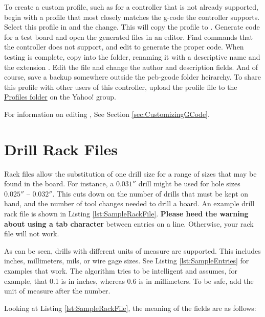 \documentclass[11pt]{book}
\begin{document}
To create a custom profile, such as for a controller that is not already supported, begin with a profile that most closely matches the g-code the controller supports. Select this profile in  and  the change. This will copy the profile to . Generate code for a test board and open the generated files in an editor. Find commands that the controller does not support, and edit  to generate the proper code. When testing is complete, copy  into the  folder, renaming it with a descriptive name and the extension . Edit the file and change the author and description fields. And of course, save a backup somewhere outside the pcb-gcode folder heirarchy. To share this profile with other users of this controller, upload the profile file to the \href{http://groups.yahoo.com/group/pcb-gcode/files/%21%20Software/Profiles/}{Profiles folder} on the Yahoo! group.

For information on editing , See Section \vref{sec:CustomizingGCode}.


%
%
\section{Drill Rack Files}\label{sec:DrillRackFiles}

Rack files allow the substitution of one drill size for a range of sizes that may be found in the board. For instance, a $0.031''$ drill might be used for hole sizes $0.025''$ -- $0.032''$. This cuts down on the number of drills that must be kept on hand, and the number of tool changes needed to drill a board. An example drill rack file is shown in Listing \ref{lst:SampleRackFile}. \textbf{Please heed the warning about using a tab character} between entries on a line. Otherwise, your rack file will not work.

As can be seen, drills with different units of measure are supported. This includes inches, millimeters, mils, or wire gage sizes. See Listing \ref{lst:SampleEntries} for examples that work. The algorithm tries to be intelligent and assumes, for example, that 0.1 is in inches, whereas 0.6 is in millimeters. To be safe, add the unit of measure after the number.

Looking at Listing \ref{lst:SampleRackFile}, the meaning of the fields are as follows:
\end{document}
